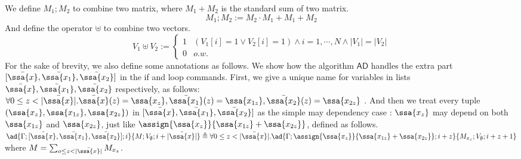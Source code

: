 We define $M_1;M_2$ to combine two matrix, where $M_1 + M_2$ is the standard sum of two matrix.
\[
M_1 ; M_2  :=  M_2 \cdot M_1 + M_1 + M_2 
\]
And define the operator $\uplus$ to combine two vectors.
\[
V_1 \uplus V_2  :=  \left\{
\begin{array}{ll}
1 & (V_1[i] = 1 \lor V_2[i] = 1) \land i = 1, \cdots, N \land |V_1| = |V_2|\\
0 & o.w.
\end{array}\right.
\]
For the sake of brevity, we also define some annotations as follows. We show how the algorithm $\mathsf{AD}$ handles the extra part $[ \bar{\ssa{x}}, \bar{\ssa{x_1}},\bar{\ssa{x_2}} ] $ in the if and loop commands. First, we give a unique name for variables in lists $\bar{\ssa{x}}, \bar{\ssa{x_1}}, \bar{\ssa{x_2}}$ respectively, as follows: {$ \forall 0 \leq z < |\bar{\ssa{x}}|. \bar{\ssa{x}}(z) = \ssa{x_z}, \bar{\ssa{x_1}}(z) = \ssa{x_{1z}}, \bar{\ssa{x_2}}(z) = \ssa{x_{2z}} $ }. And then we treat every tuple $(\ssa{x_z},\ssa{x_{1z}},\ssa{x_{2z}} )$ in $[\bar{\ssa{x}}, \bar{\ssa{x_1}}, \bar{\ssa{x_2}} ]$ as the simple may dependency case : $\ssa{x_z}$ may depend on both $ \ssa{x_{1z}}$ and $\ssa{x_{2z}}$, just like $ \assign{\ssa{x_z} }{\ssa{x_{1z}} + \ssa{x_{2z}} }$, defined as follows. 
$
 \ad{\Gamma; [\bar{\ssa{x}}, \bar{\ssa{x_1}}, \bar{\ssa{x_2}} ] ; i }{ M; V_{\emptyset}; i + |\bar{\ssa{x}}| } 
  \triangleq { \forall 0 \leq z < |\bar{\ssa{x}}|.
  \ad{\Gamma;\assign{\ssa{x_z} }{\ssa{x_{1z}} + \ssa{x_{2z}} }; i+z }{ M_{x_z};  V_{\emptyset}; i+z+1} }$
   where $M = \sum_{o \leq z < |\bar{\ssa{x}}| }M_{x_z} $.
%

